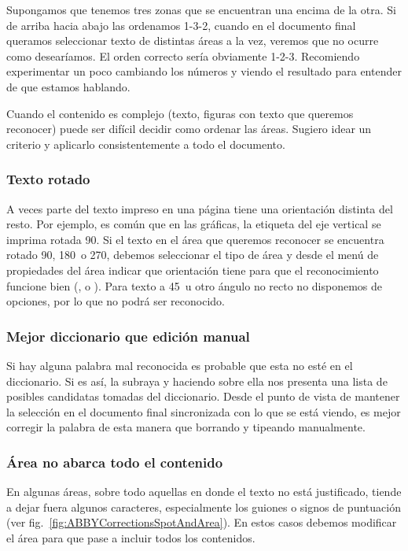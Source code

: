 \documentclass[%
	a5paper,
	10pt,
	twoside,
	openright,
	final,
]{memoir}
\begin{document}
	Supongamos que tenemos tres zonas que se encuentran una encima de la otra. Si de arriba hacia abajo las ordenamos 1-3-2, cuando en el documento final queramos seleccionar texto de distintas áreas a la vez, veremos que no ocurre como desearíamos. El orden correcto sería obviamente 1-2-3. Recomiendo experimentar un poco cambiando los números y viendo el resultado para entender de que estamos hablando.

	Cuando el contenido es complejo (texto, figuras con texto que queremos reconocer) puede ser difícil decidir como ordenar las áreas. Sugiero idear un criterio y aplicarlo consistentemente a todo el documento.

	\subsubsection{Texto rotado} A veces parte del texto impreso en una página tiene una orientación distinta del resto. Por ejemplo, es común que en las gráficas, la etiqueta del eje vertical se imprima rotada 90\textdegree. Si el texto en el área que queremos reconocer se encuentra rotado 90\textdegree, 180\textdegree\ o 270\textdegree, debemos seleccionar el tipo de área  y desde el menú de propiedades del área indicar que orientación tiene para que el reconocimiento funcione bien (,  o ). Para texto a 45\textdegree\ u otro ángulo no recto no disponemos de opciones, por lo que no podrá ser reconocido.

	\subsubsection{Mejor diccionario que edición manual} Si hay alguna palabra mal reconocida es probable que esta no esté en el diccionario. Si es así, \abby la subraya y haciendo \keys{\rightclick} sobre ella nos presenta una lista de posibles candidatas tomadas del diccionario. Desde el punto de vista de mantener la selección en el documento final sincronizada con lo que se está viendo, es mejor corregir la palabra de esta manera que borrando y tipeando manualmente.

	\subsubsection{Área no abarca todo el contenido} En algunas áreas, sobre todo aquellas en donde el texto no está justificado, \abby tiende a dejar fuera algunos caracteres, especialmente los guiones o signos de puntuación (ver fig.~\ref{fig:ABBYCorrectionsSpotAndArea}). En estos casos debemos modificar el área para que pase a incluir todos los contenidos.
\end{document}
